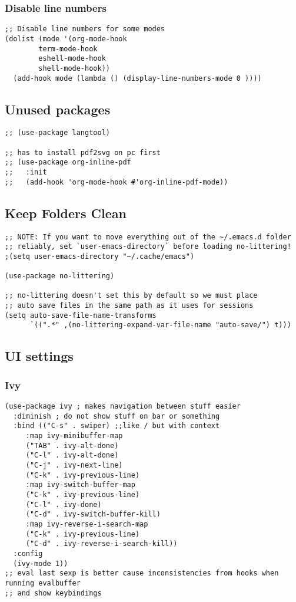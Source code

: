 \documentclass[11pt]{article}
\begin{document}
\subsubsection{Disable line numbers}
\label{sec:org403b8ac}
\begin{verbatim}
;; Disable line numbers for some modes
(dolist (mode '(org-mode-hook
		term-mode-hook
		eshell-mode-hook
		shell-mode-hook))
  (add-hook mode (lambda () (display-line-numbers-mode 0 ))))
\end{verbatim}
\subsection{Unused packages}
\label{sec:org40bd837}
\begin{verbatim}
;; (use-package langtool)

;; has to install pdf2svg on pc first
;; (use-package org-inline-pdf
;;   :init
;;   (add-hook 'org-mode-hook #'org-inline-pdf-mode))
\end{verbatim}
\subsection{Keep Folders Clean}
\label{sec:orgd8bcbbf}
\begin{verbatim}
;; NOTE: If you want to move everything out of the ~/.emacs.d folder
;; reliably, set `user-emacs-directory` before loading no-littering!
;(setq user-emacs-directory "~/.cache/emacs")

(use-package no-littering)

;; no-littering doesn't set this by default so we must place
;; auto save files in the same path as it uses for sessions
(setq auto-save-file-name-transforms
      `((".*" ,(no-littering-expand-var-file-name "auto-save/") t)))
\end{verbatim}
\subsection{UI settings}
\label{sec:org5827422}
\subsubsection{Ivy}
\label{sec:org5c70c55}
\begin{verbatim}
(use-package ivy ; makes navigation between stuff easier
  :diminish ; do not show stuff on bar or something
  :bind (("C-s" . swiper) ;;like / but with context
	 :map ivy-minibuffer-map
	 ("TAB" . ivy-alt-done)	
	 ("C-l" . ivy-alt-done)
	 ("C-j" . ivy-next-line)
	 ("C-k" . ivy-previous-line)
	 :map ivy-switch-buffer-map
	 ("C-k" . ivy-previous-line)
	 ("C-l" . ivy-done)
	 ("C-d" . ivy-switch-buffer-kill)
	 :map ivy-reverse-i-search-map
	 ("C-k" . ivy-previous-line)
	 ("C-d" . ivy-reverse-i-search-kill))
  :config
  (ivy-mode 1))
;; eval last sexp is better cause inconsistencies from hooks when running evalbuffer
;; and show keybindings
\end{verbatim}
\end{document}

